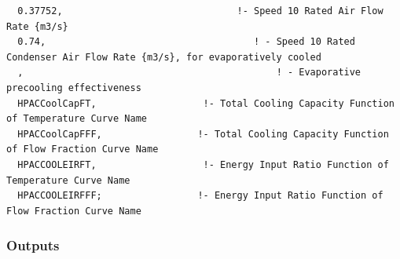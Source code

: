 \begin{lstlisting}
  0.37752,                               !- Speed 10 Rated Air Flow Rate {m3/s}
  0.74,                                     ! - Speed 10 Rated Condenser Air Flow Rate {m3/s}, for evaporatively cooled
  ,                                             ! - Evaporative precooling effectiveness
  HPACCoolCapFT,                   !- Total Cooling Capacity Function of Temperature Curve Name
  HPACCoolCapFFF,                 !- Total Cooling Capacity Function of Flow Fraction Curve Name
  HPACCOOLEIRFT,                   !- Energy Input Ratio Function of Temperature Curve Name
  HPACCOOLEIRFFF;                 !- Energy Input Ratio Function of Flow Fraction Curve Name
\end{lstlisting}

\subsubsection{Outputs}\label{outputs-13-001}

